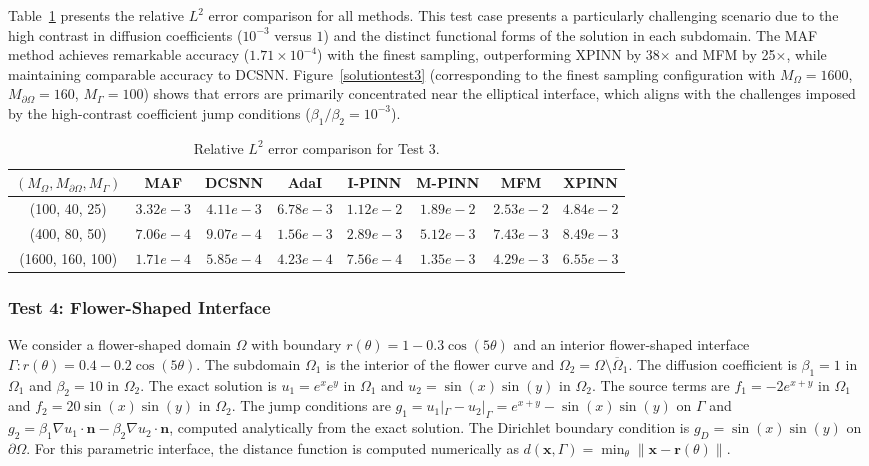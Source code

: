 \documentclass{article}
\begin{document}
Table~\ref{errortabletest3} presents the relative $L^2$ error comparison for all methods. This test case presents a particularly challenging scenario due to the high contrast in diffusion coefficients ($10^{-3}$ versus $1$) and the distinct functional forms of the solution in each subdomain. The MAF method achieves remarkable accuracy ($1.71 \times 10^{-4}$) with the finest sampling, outperforming XPINN by 38$\times$ and MFM by 25$\times$, while maintaining comparable accuracy to DCSNN. Figure~\ref{solutiontest3} (corresponding to the finest sampling configuration with $M_\Omega=1600$, $M_{\partial\Omega}=160$, $M_\Gamma=100$) shows that errors are primarily concentrated near the elliptical interface, which aligns with the challenges imposed by the high-contrast coefficient jump conditions ($\beta_1/\beta_2 = 10^{-3}$).

\begin{table}[H]
    \centering
    \caption{Relative $L^2$ error comparison for Test 3.}
    \label{errortabletest3}
    \small
    \begin{tabular}{|c|c|c|c|c|c|c|c|}
        \hline
        $(M_\Omega, M_{\partial\Omega}, M_\Gamma)$ & MAF & DCSNN & AdaI & I-PINN & M-PINN & MFM & XPINN \\
        \hline
        (100, 40, 25) & $3.32e{-}3$ & $4.11e{-}3$ & $6.78e{-}3$ & $1.12e{-}2$ & $1.89e{-}2$ & $2.53e{-}2$ & $4.84e{-}2$ \\
        \hline
        (400, 80, 50) & $7.06e{-}4$ & $9.07e{-}4$ & $1.56e{-}3$ & $2.89e{-}3$ & $5.12e{-}3$ & $7.43e{-}3$ & $8.49e{-}3$ \\
        \hline
        (1600, 160, 100) & $1.71e{-}4$ & $5.85e{-}4$ & $4.23e{-}4$ & $7.56e{-}4$ & $1.35e{-}3$ & $4.29e{-}3$ & $6.55e{-}3$ \\
        \hline
    \end{tabular}
\end{table}

\subsubsection{Test 4: Flower-Shaped Interface}

We consider a flower-shaped domain $\Omega$ with boundary $r(\theta) = 1 - 0.3\cos(5\theta)$ and an interior flower-shaped interface $\Gamma: r(\theta) = 0.4 - 0.2\cos(5\theta)$. The subdomain $\Omega_1$ is the interior of the flower curve and $\Omega_2 = \Omega \setminus \overline{\Omega}_1$. The diffusion coefficient is $\beta_1 = 1$ in $\Omega_1$ and $\beta_2 = 10$ in $\Omega_2$. The exact solution is $u_1 = e^x e^y$ in $\Omega_1$ and $u_2 = \sin(x)\sin(y)$ in $\Omega_2$. The source terms are $f_1 = -2e^{x+y}$ in $\Omega_1$ and $f_2 = 20\sin(x)\sin(y)$ in $\Omega_2$. The jump conditions are $g_1 = u_1|_\Gamma - u_2|_\Gamma = e^{x+y} - \sin(x)\sin(y)$ on $\Gamma$ and $g_2 = \beta_1 \nabla u_1 \cdot \boldsymbol{n} - \beta_2 \nabla u_2 \cdot \boldsymbol{n}$, computed analytically from the exact solution. The Dirichlet boundary condition is $g_D = \sin(x)\sin(y)$ on $\partial\Omega$. For this parametric interface, the distance function is computed numerically as $d(\mathbf{x}, \Gamma) = \min_{\theta} \|\mathbf{x} - \mathbf{r}(\theta)\|$.
\end{document}
